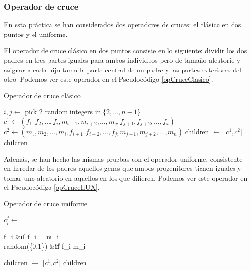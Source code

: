\documentclass[a4paper, 11pt, titlepage]{article}
\begin{document}
    \subsubsection*{Operador de cruce}

    En esta práctica se han considerados dos operadores de cruces: el clásico en dos puntos y el uniforme.

    El operador de cruce clásico en dos puntos consiste en lo siguiente: dividir los dos padres en tres partes iguales para ambos individuos pero de tamaño aleatorio y asignar a cada hijo toma la parte central de un padre y las partes exteriores del otro. Podemos ver este operador en el Pseudocódigo \ref{opCruceClasico}.

    \begin{algorithm}
        \caption{Operador de cruce clásico}\label{opCruceClasico}
        \begin{algorithmic}[1]
             
            \State $i, j \gets$ pick 2 random integers in $\{2,\dots,n-1\}$ 
            \State $c^1 \gets (f_1, f_2, \dots, f_i, m_{i+1}, m_{i+2}, \dots, m_j, f_{j+1}, f_{j+2}, \dots, f_n)$
            \State $c^2 \gets (m_1, m_2, \dots, m_i, f_{i+1}, f_{i+2}, \dots, f_j, m_{j+1}, m_{j+2}, \dots, m_n)$
            \State children $\gets$ [$c^1, c^2$]
            \State \Return children
        \end{algorithmic}
    \end{algorithm}

    Además, se han hecho las mismas pruebas con el operador uniforme, consistente en heredar de los padres aquellos genes que ambos progenitores tienen iguales y tomar uno aleatorio en aquellos en los que difieren. Podemos ver este operador en el Pseudocódigo \ref{opCruceHUX}.

    \begin{algorithm}
        \caption{Operador de cruce uniforme}\label{opCruceHUX}
        \begin{algorithmic}[1]
             
             
                    \State $c^j_i \gets$ \begin{cases}
                        f_i &\textrm{\textbf{if} } f_i = m_i \\
                        random(\{0,1\}) &\textrm{\textbf{if} } f_i \neq m_i
                \end{cases}
                \EndFor
            \EndFor
            \State children $\gets$ [$c^1, c^2$]
            \State \Return children
        \end{algorithmic}
    \end{algorithm}
\end{document}
